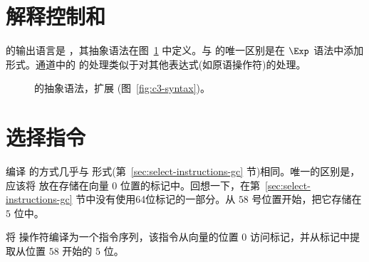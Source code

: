 \documentclass[11pt]{book}
\newcommand{\gray}[1]{{\color{gray} #1}}
\begin{document}
\section{解释控制和 \LangCLam{}}
\label{sec:explicate-r5}

  的输出语言是 \LangCLam{} ，其抽象语法在图~\ref{fig:c4-syntax} 中定义。与 \LangCFun{} 的唯一区别是在 $\Exp$ 语法中添加
 形式。通道中的  的处理类似于对其他表达式(如原语操作符)的处理。

\begin{figure}[tp]
\fbox{
\begin{minipage}{0.96\textwidth}
\small
\[
\begin{array}{lcl}
\Exp &::= & \ldots
   \mid \ALLOCCLOS{\Int}{\Type}{\Int} \\
\Stmt &::=& \gray{ \ASSIGN{\VAR{\Var}}{\Exp} 
       \mid \LP\key{Collect} \,\itm{int}\RP } \\
\Tail &::= & \gray{ \RETURN{\Exp} \mid \SEQ{\Stmt}{\Tail} 
       \mid \GOTO{\itm{label}} } \\
    &\mid& \gray{ \IFSTMT{\BINOP{\itm{cmp}}{\Atm}{\Atm}}{\GOTO{\itm{label}}}{\GOTO{\itm{label}}}  }\\
    &\mid& \gray{ \TAILCALL{\Atm}{\Atm\ldots} } \\
\Def &::=& \gray{ \DEF{\itm{label}}{\LP[\Var\key{:}\Type]\ldots\RP}{\Type}{\itm{info}}{\LP\LP\itm{label}\,\key{.}\,\Tail\RP\ldots\RP} }\\
\LangCLam{} & ::= & \gray{ \PROGRAMDEFS{\itm{info}}{\LP\Def\ldots\RP} }
\end{array}
\]
\end{minipage}
}
\caption{ \LangCLam{} 的抽象语法，扩展 \LangCFun{} (图~\ref{fig:c3-syntax})。}
\label{fig:c4-syntax}
\end{figure}


\section{选择指令}
\label{sec:select-instructions-Rlambda}

编译  的方式几乎与  形式(第~\ref{sec:select-instructions-gc} 节)相同。唯一的区别是，应该将  放在存储在向量 $0$ 位置的标记中。回想一下，在第~\ref{sec:select-instructions-gc} 节中没有使用64位标记的一部分。从 $58$ 号位置开始，把它存储在 $5$ 位中。

将  操作符编译为一个指令序列，该指令从向量的位置 $0$ 访问标记，并从标记中提取从位置 $58$ 开始的 $5$ 位。
\end{document}
